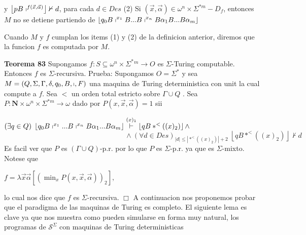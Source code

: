 y \(\left\lfloor pB\shortmid ^{f(\vec{x},\vec{\alpha})}\right\rfloor \nvdash d \), para cada \(d\in Des\)
(2) Si \((\vec{x},\vec{\alpha})\in \omega ^{n}\times \Sigma ^{\ast m}-D_{f}\), entonces \(M\) no se detiene partiendo de
\(\displaystyle \left\lfloor q_{0}B\shortmid ^{x_{1}}B...B\shortmid ^{x_{n}}B\alpha _{1}B...B\alpha _{m}\right\rfloor \)

Cuando \(M\) y \(f\) cumplan los items (1) y (2) de la definicion anterior, diremos que la funcion \(f\) es computada por \(M\).




\textbf{Teorema 83} Supongamos \(f:S\subseteq \omega ^{n}\times \Sigma ^{\ast }{}^{m}\rightarrow O \) es \(\Sigma \)-Turing computable. Entonces \(f\) es \(\Sigma \)-recursiva.
Prueba: Supongamos \(O=\Sigma ^{\ast }\) y sea \(M=\left( Q,\Sigma ,\Gamma ,\delta ,q_{0},B,\shortmid ,F\right) \) una maquina de Turing deterministica con unit la cual compute a \(f\). Sea \(< \) un orden total estricto sobre \(\Gamma \cup Q\) . Sea \(P:\mathbf{N}\times \omega ^{n}\times \Sigma ^{\ast m}\rightarrow \omega \) dado por \(P(x,\vec{x},\vec{\alpha})=1\) sii

\((\exists q\in Q)\;\left\lfloor q_{0}B\shortmid ^{x_{1}}...B\shortmid ^{x_{n}}B\alpha _{1}...B\alpha _{m}\right\rfloor \overset{(x)_{1}}{\vdash } \left\lfloor qB\ast ^{< }((x)_{2})\right\rfloor \wedge \)
\(\ \ \ \ \ \ \ \ \ \ \ \ \ \ \ \ \ \ \ \ \ \ \ \ \ \ \ \ \ \ \ \ \ \ \ \ \ \ \ \ \ \ \ \ \ \ \ \ \ \ \ \ \ \ \ \ \ \ \ \ \ \ \ \ \ \ \ \ \ \ \ \ \ \ \ \ \ \wedge (\forall d\in Des)_{\left\vert d\right\vert \leq \left\vert \ast ^{< }((x)_{2})\right\vert +2}\;\left\lfloor qB\ast ^{< }((x)_{2})\right\rfloor \nvdash d\)
Es facil ver que \(P\) es \((\Gamma \cup Q)\)-p.r. por lo que \(P\) es \( \Sigma \)-p.r. ya que es \(\Sigma \)-mixto. Notese que

\(\displaystyle f=\lambda \vec{x}\vec{\alpha}\left[ \left( \min_{x}P(x,\vec{x},\vec{\alpha} )\right) _{2}\right] \text{,} \)

lo cual nos dice que \(f\) es \(\Sigma \)-recursiva. \(\Box\)
A continuacion nos proponemos probar que el paradigma de las maquinas de Turing es completo. El siguiente lema es clave ya que nos muestra como pueden simularse en forma muy natural, los programas de \(\mathcal{S}^{\Sigma }\) con maquinas de Turing deterministicas




